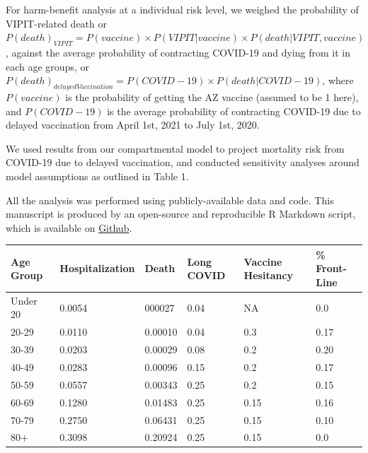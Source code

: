 \documentclass[]{interact}
\theoremstyle{plain}%
\theoremstyle{definition}
\theoremstyle{remark}
\begin{document}
For harm-benefit analysis at a individual risk level, we weighed the
probability of VIPIT-related death or
\(P(death)_{VIPIT} = P(vaccine) \times P(VIPIT|vaccine) \times P(death|VIPIT, vaccine)\),
against the average probability of contracting COVID-19 and dying from
it in each age groups, or
\(P(death)_{delayedVaccination} = P(COVID-19) \times P(death|COVID-19)\),
where \(P(vaccine)\) is the probability of getting the AZ vaccine
(assumed to be 1 here), and \(P(COVID-19)\) is the average probability
of contracting COVID-19 due to delayed vaccination from April 1st, 2021
to July 1st, 2020.

We used results from our compartmental model to project mortality risk
from COVID-19 due to delayed vaccination, and conducted sensitivity
analyses around model assumptions as outlined in Table 1.

All the analysis was performed using publicly-available data and code.
This manuscript is produced by an open-source and reproducible R
Markdown script, which is available on
\href{https://github.com/aminadibi/astrazenecaVIPIT}{Github}.

\begin{table}
{\begin{tabular}{llllll} \toprule
Age  Group & Hospitalization & Death   & Long COVID & Vaccine Hesitancy & \% Front-Line \\ \hline
Under 20   & 0.0054          & 000027  & 0.04       & NA                & 0.0           \\ 
20-29      & 0.0110          & 0.00010 & 0.04       & 0.3               & 0.17          \\ 
30-39      & 0.0203          & 0.00029 & 0.08       & 0.2               & 0.20          \\ 
40-49      & 0.0283          & 0.00096 & 0.15       & 0.2               & 0.17          \\ 
50-59      & 0.0557          & 0.00343 & 0.25       & 0.2               & 0.15          \\ 
60-69      & 0.1280          & 0.01483 & 0.25       & 0.15              & 0.16          \\ 
70-79      & 0.2750          & 0.06431 & 0.25       & 0.15              & 0.10          \\ 
80+        & 0.3098          & 0.20924 & 0.25       & 0.15              & 0.0           \\ \bottomrule
\end{tabular}}
\label{model-param}
\end{table}
\end{document}
